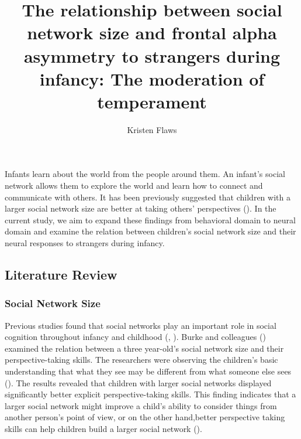 \documentclass[
  man,
  floatsintext,
  longtable,
  nolmodern,
  notxfonts,
  notimes,
  colorlinks=true,linkcolor=blue,citecolor=blue,urlcolor=blue]{apa7}
\title{The relationship between social network size and frontal alpha
asymmetry to strangers during infancy: The moderation of temperament}
\author{Kristen Flaws}
\affiliation{
{MA Program in the Social Sciences, University of Chicago}}
\begin{document}
\maketitle


\setcounter{secnumdepth}{-\maxdimen} %

\setlength\LTleft{0pt}


Infants learn about the world from the people around them. An infant's
social network allows them to explore the world and learn how to connect
and communicate with others. It has been previously suggested that
children with a larger social network size are better at taking others'
perspectives (). In the current study, we aim to expand these findings from
behavioral domain to neural domain and examine the relation between
children's social network size and their neural responses to strangers
during infancy.

\subsection{Literature Review}\label{literature-review}

\subsubsection{Social Network Size}\label{social-network-size}

Previous studies found that social networks play an important role in
social cognition throughout infancy and childhood
(,
). Burke and
colleagues ()
examined the relation between a three year-old's social network size and
their perspective-taking skills. The researchers were observing the
children's basic understanding that what they see may be different from
what someone else sees
().
The results revealed that children with larger social networks displayed
significantly better explicit perspective-taking skills. This finding
indicates that a larger social network might improve a child's ability
to consider things from another person's point of view, or on the other
hand,better perspective taking skills can help children build a larger
social network ().
\end{document}
